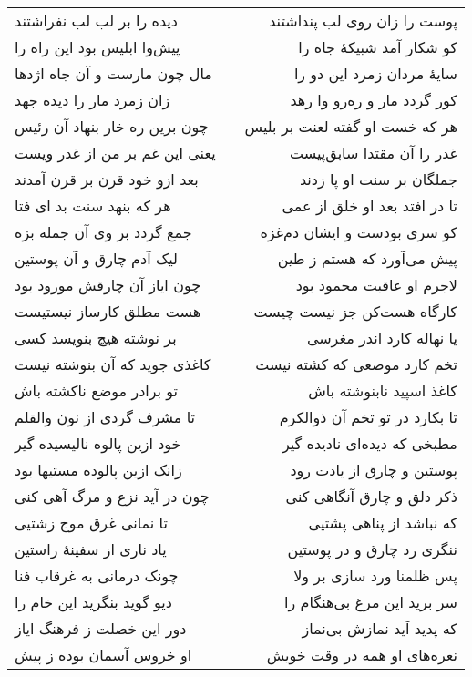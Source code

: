 \begin{center}
\begin{longtable}{l p{0.5cm} r}
دیده را بر لب لب نفراشتند
&&
پوست را زان روی لب پنداشتند
\\
پیش‌وا ابلیس بود این راه را
&&
کو شکار آمد شبیکهٔ جاه را
\\
مال چون مارست و آن جاه اژدها
&&
سایهٔ مردان زمرد این دو را
\\
زان زمرد مار را دیده جهد
&&
کور گردد مار و ره‌رو وا رهد
\\
چون برین ره خار بنهاد آن رئیس
&&
هر که خست او گفته لعنت بر بلیس
\\
یعنی این غم بر من از غدر ویست
&&
غدر را آن مقتدا سابق‌پیست
\\
بعد ازو خود قرن بر قرن آمدند
&&
جملگان بر سنت او پا زدند
\\
هر که بنهد سنت بد ای فتا
&&
تا در افتد بعد او خلق از عمی
\\
جمع گردد بر وی آن جمله بزه
&&
کو سری بودست و ایشان دم‌غزه
\\
لیک آدم چارق و آن پوستین
&&
پیش می‌آورد که هستم ز طین
\\
چون ایاز آن چارقش مورود بود
&&
لاجرم او عاقبت محمود بود
\\
هست مطلق کارساز نیستیست
&&
کارگاه هست‌کن جز نیست چیست
\\
بر نوشته هیچ بنویسد کسی
&&
یا نهاله کارد اندر مغرسی
\\
کاغذی جوید که آن بنوشته نیست
&&
تخم کارد موضعی که کشته نیست
\\
تو برادر موضع ناکشته باش
&&
کاغذ اسپید نابنوشته باش
\\
تا مشرف گردی از نون والقلم
&&
تا بکارد در تو تخم آن ذوالکرم
\\
خود ازین پالوه نالیسیده گیر
&&
مطبخی که دیده‌ای نادیده گیر
\\
زانک ازین پالوده مستیها بود
&&
پوستین و چارق از یادت رود
\\
چون در آید نزع و مرگ آهی کنی
&&
ذکر دلق و چارق آنگاهی کنی
\\
تا نمانی غرق موج زشتیی
&&
که نباشد از پناهی پشتیی
\\
یاد ناری از سفینهٔ راستین
&&
ننگری رد چارق و در پوستین
\\
چونک درمانی به غرقاب فنا
&&
پس ظلمنا ورد سازی بر ولا
\\
دیو گوید بنگرید این خام را
&&
سر برید این مرغ بی‌هنگام را
\\
دور این خصلت ز فرهنگ ایاز
&&
که پدید آید نمازش بی‌نماز
\\
او خروس آسمان بوده ز پیش
&&
نعره‌های او همه در وقت خویش
\\
\end{longtable}
\end{center}
